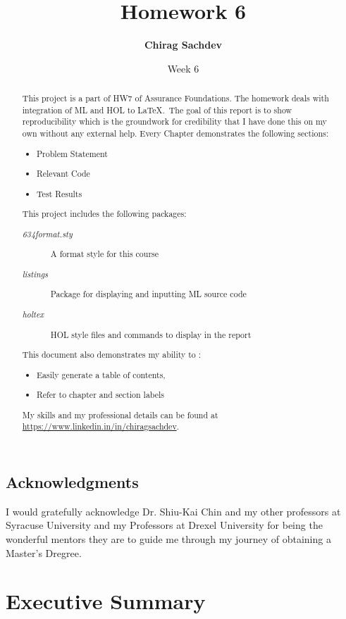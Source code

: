 \documentclass{report}
\title{Homework 6}
\author{\textbf{Chirag Sachdev}}
\date{Week 6}
\begin{document}
\lstset{language=ML}
\maketitle{}

\begin{abstract}
This project is a part of HW7 of Assurance Foundations. The homework deals with integration of ML and HOL to \LaTeX.\ The goal of this report is to show reproducibility which is the groundwork for credibility that I have done this on my own without any external help. Every Chapter demonstrates the following sections:
	\begin{itemize}
		\item Problem Statement
		\item Relevant Code
		\item Test Results
	\end{itemize}
	
This project includes the following packages:
	\begin{description}
		\item[\emph{634format.sty}] A format style for this course
		\item[\emph{listings}] Package for displaying and inputting ML source code
		\item[\emph{holtex}] HOL style files and commands to display in the report
	\end{description}

This document also demonstrates my ability to :
	\begin{itemize}
		\item Easily generate a table of contents,
		\item Refer to chapter and section labels
	\end{itemize}

My skills and my professional details can be found at \url{https://www.linkedin.in/in/chiragsachdev}.
\end{abstract}

\section*{Acknowledgments}
I would gratefully acknowledge Dr. Shiu-Kai Chin and my other professors at Syracuse University and my Professors at Drexel University for being the wonderful mentors they are to guide me through my journey of obtaining a Master's Dregree.

\tableofcontents{}

\chapter{Executive Summary}
\label{cha:executive-summary}
\end{document}
